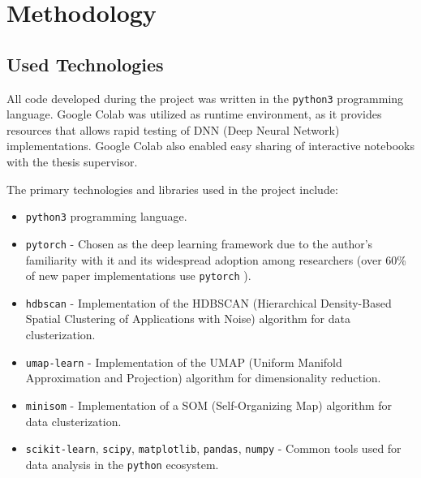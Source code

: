 \section{Methodology}
\subsection{Used Technologies}

All code developed during the project was written in the \texttt{python3} programming language. Google Colab was utilized as runtime environment, as it provides resources that allows rapid testing of DNN (Deep Neural Network) implementations. 
Google Colab also enabled easy sharing of interactive notebooks with the thesis supervisor.

The primary technologies and libraries used in the project include:
\begin{itemize}
    \item \texttt{python3} programming language.
    \item \texttt{pytorch} - Chosen as the deep learning framework due to the author's familiarity with it and its widespread adoption among researchers (over 60\% of new paper implementations use \texttt{pytorch} \cite{papersWithCodeTrends}).
    \item \texttt{hdbscan} - Implementation of the HDBSCAN (Hierarchical Density-Based Spatial Clustering of Applications with Noise) algorithm for data clusterization.
    \item \texttt{umap-learn} - Implementation of the UMAP (Uniform Manifold Approximation and Projection) algorithm for dimensionality reduction.
    \item \texttt{minisom} - Implementation of a SOM (Self-Organizing Map) algorithm for data clusterization.
    \item \texttt{scikit-learn}, \texttt{scipy}, \texttt{matplotlib}, \texttt{pandas}, \texttt{numpy} - Common tools used for data analysis in the \texttt{python} ecosystem.
\end{itemize}